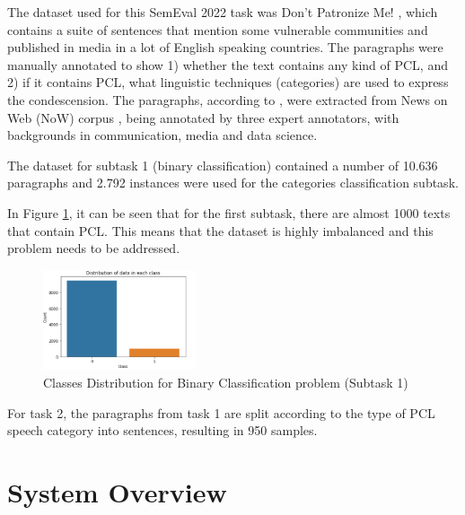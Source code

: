 \documentclass[11pt]{article}
\begin{document}
The dataset used for this SemEval 2022 task was Don't Patronize Me! \cite{perezalmendros2020dont},
which contains a suite of sentences that mention some vulnerable communities
and published in media in a lot of English speaking countries. The
paragraphs were manually annotated to show 1) whether the text contains any
kind of PCL, and 2) if it contains PCL, what linguistic techniques
(categories) are used to express the condescension. The paragraphs, according to \cite{perezalmendros2020dont}, were extracted from News on Web (NoW) corpus \cite{davies}, being annotated by three expert annotators, with backgrounds in communication, media and data science.

The dataset for subtask 1 (binary classification) contained a number of
10.636 paragraphs and 2.792 instances were used for the categories
classification subtask.

In Figure \ref{fig1}, it can be seen that for the first subtask, there are almost
1000 texts that contain PCL. This means that the dataset is highly imbalanced and this problem needs to be addressed.


\begin{figure}[ht]
	\centering
	\includegraphics[width=0.4\textwidth]{DataDistribution.png}
	\caption{Classes Distribution for Binary Classification problem (Subtask 1)}
	\label{fig1}
\end{figure}


For task 2, the paragraphs from task 1 are split according to the type of PCL speech category into sentences, resulting in 950 samples.

\section{System Overview}
\end{document}
